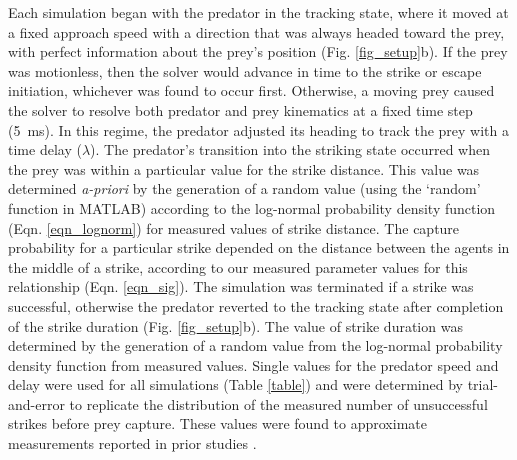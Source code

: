\documentclass[]{rsos}%
\begin{document}
Each simulation began with the predator in the tracking state, where it moved at a fixed approach speed with a direction that was always headed toward the prey, with perfect information about the prey's position (Fig. \ref{fig_setup}b). 
If the prey was motionless, then the solver would advance in time to the strike or escape initiation, whichever was found to occur first.
Otherwise, a moving prey caused the solver to resolve both predator and prey kinematics at a fixed time step (\SI{5}{\ms}). 
In this regime, the predator adjusted its heading to track the prey with a time delay ($\lambda$).  
The predator's transition into the striking state occurred when the prey was within a particular value for the strike distance. 
This value was determined \textit{a-priori} by the generation of a random value (using the `random' function in MATLAB) according to the log-normal probability density function (Eqn. \ref{eqn_lognorm}) for measured values of strike distance.
The capture probability for a particular strike depended on the distance between the agents in the middle of a strike, according to our measured parameter values for this relationship (Eqn. \ref{eqn_sig}).
The simulation was terminated if a strike was successful, otherwise the predator reverted to the tracking state after completion of the strike duration (Fig. \ref{fig_setup}b).
The value of strike duration was determined by the generation of a random value from the log-normal probability density function from measured values.
Single values for the predator speed and delay were used for all simulations (Table \ref{table}) and were determined by trial-and-error to replicate the distribution of the measured number of unsuccessful strikes before prey capture. 
These values were found to approximate measurements reported in prior studies \cite{McHenry:2005tc, Stewart:2013bha}. 
\end{document}

